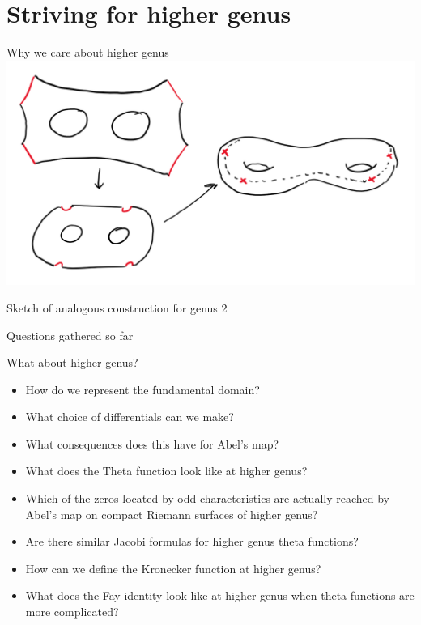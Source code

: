 \documentclass[11pt,aspectratio=169]{beamer}
\begin{document}
\section{Striving for higher genus}

\begin{frame}{Why we care about higher genus}
    \center{}
    \includegraphics[width=0.7\columnwidth]{assets/MyGenus2.png}

    \tiny Sketch of analogous construction for genus 2
\end{frame}

\begin{frame}{Questions gathered so far}
    {
        \begin{block}{What about higher genus?}
            \begin{itemize}
                \item How do we represent the fundamental domain?
                \item What choice of differentials can we make?
                \item What consequences does this have for Abel's map?
                \item What does the Theta function look like at higher genus?
                \item Which of the zeros located by odd characteristics are actually reached by Abel's map on compact Riemann surfaces of higher genus?
                \item Are there similar Jacobi formulas for higher genus theta functions?
                \item How can we define the Kronecker function at higher genus?
                \item What does the Fay identity look like at higher genus when theta functions are more complicated?
            \end{itemize}
        \end{block}
    }
\end{frame}
\end{document}
